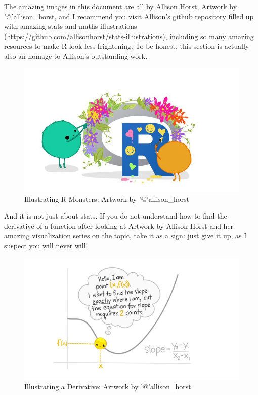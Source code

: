 \documentclass[
]{article}
\begin{document}
The amazing images in this document are all by Allison Horst, Artwork by
'@'allison\_horst, and I recommend you visit Allison's github repository
filled up with amazing stats and maths illustrations
(\url{https://github.com/allisonhorst/stats-illustrations}), including
so many amazing resources to make R look less frightening. To be honest,
this section is actually also an homage to Allison's outstanding work.

\begin{figure}
\centering
\includegraphics{extfiles/monsteRs.jpg}
\caption{Illustrating R Monsters: Artwork by '@'allison\_horst}
\end{figure}

And it is not just about stats. If you do not understand how to find the
derivative of a function after looking at Artwork by Allison Horst and
her amazing visualization series on the topic, take it as a sign: just
give it up, as I suspect you will never will!

\begin{figure}
\centering
\includegraphics{extfiles/derivative_1.jpg}
\caption{Illustrating a Derivative: Artwork by '@'allison\_horst}
\end{figure}
\end{document}
